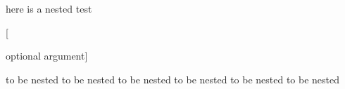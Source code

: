 here is a nested test
\begin{one}


	[

		optional argument]



	to be nested to be nested
	to be nested to be nested
	to be nested to be nested
\end{one}
